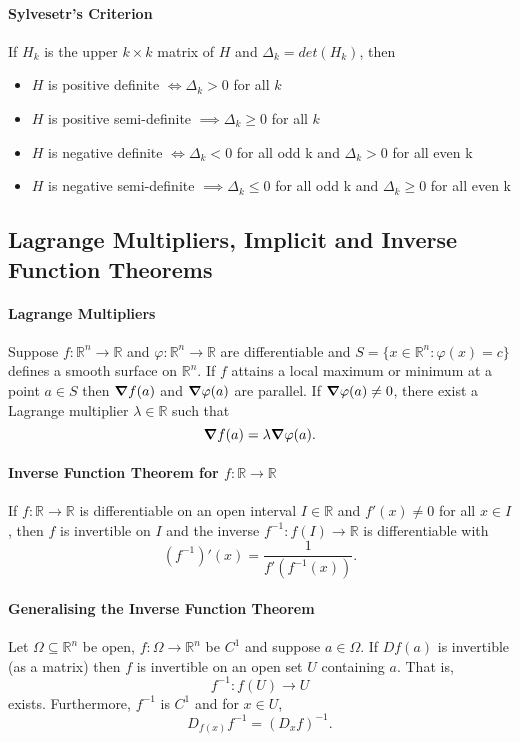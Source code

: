 \paragraph{Sylvesetr's Criterion}
If \(H_k\) is the upper \(k \times k\) matrix of \(H\) and \(\Delta_k = det(H_k)\), then
\begin{itemize}
    \item \(H\) is positive definite \(\iff \Delta_k > 0\) for all \(k\)
    \item \(H\) is positive semi-definite \(\implies \Delta_k \geq 0\) for all \(k\)
    \item \(H\) is negative definite \(\iff \Delta_k < 0\) for all odd k and \(\Delta_k > 0\) for all even k
    \item \(H\) is negative semi-definite \(\implies \Delta_k \leq 0\) for all odd k and \(\Delta_k \geq 0\) for all even k
\end{itemize}

\subsection{Lagrange Multipliers, Implicit and Inverse Function Theorems}
\paragraph{Lagrange Multipliers}
Suppose \(f: \mathbb R^n \to \mathbb R\) and \(\varphi: \mathbb R^n \to \mathbb R\) 
are differentiable and \(S = \{ x \in \mathbb R^n: \varphi(x) = c \}\) defines a smooth
surface on \(\mathbb R^n\). If \(f\) attains a local maximum or minimum at a point \(a \in S\)
then \(\grad f(a)\) and \(\grad\varphi(a)\) are parallel. If \(\grad\varphi(a) \neq 0\), 
there exist a Lagrange multiplier \(\lambda \in \mathbb R\) such that 
\[\grad f(a) = \lambda\grad\varphi(a).\]

\paragraph{Inverse Function Theorem for \(f: \mathbb R \to \mathbb R\)}
If \(f: \mathbb R \to \mathbb R\) is differentiable on an open interval \(I \in \mathbb R\)
and \(f'(x) \neq 0\) for all \(x \in I\), then \(f\) is invertible on \(I\) and the inverse
\(f^{-1}:f(I)\to \mathbb R\) is differentiable with
\[(f^{-1})'(x) = \frac{1}{f'(f^{-1}(x))}.\]

\paragraph{Generalising the Inverse Function Theorem}
Let \(\Omega\subseteq\mathbb R^n\) be open, \(f:\Omega \to \mathbb R^n\) be \(C^1\) and 
suppose \(a \in \Omega\). If \(Df(a)\) is invertible (as a matrix) then \(f\) is invertible
on an open set \(U\) containing \(a\). That is,
\[f^{-1}:f(U) \to U\]
exists. Furthermore, \(f^{-1}\) is \(C^1\) and for \(x \in U\),
\[D_{f(x)}f^{-1} = (D_x f)^{-1}.\]